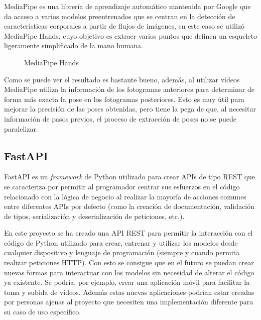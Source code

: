 MediaPipe es una librería de aprendizaje automático mantenida por Google que da
acceso a varios modelos preentrenados que se centran en la detección de
características corporales a partir de flujos de imágenes, en este caso se
utilizó MediaPipe Hands\cite{zhang2020mediapipe}, cuyo objetivo es extraer
varios puntos que definen un esqueleto ligeramente simplificado de la mano
humana.

\begin{figure}[H]
      \centering
      \caption{MediaPipe Hands}
\end{figure}

Como se puede ver el resultado es bastante bueno, además, al utilizar vídeos
MediaPipe utiliza la información de los fotogramas anteriores para determinar de
forma más exacta la pose en los fotogramas posteriores. Esto es muy útil para
mejorar la precisión de las poses obtenidas, pero tiene la pega de que, al
necesitar información de pasos previos, el proceso de extracción de poses no se
puede paralelizar.

\subsection{FastAPI}

FastAPI es un \textit{framework} de Python utilizado para crear APIs de tipo
REST que se caracteriza por permitir al programador centrar sus esfuerzos en el
código relacionado con la lógica de negocio al realizar la mayoría de acciones
comunes entre diferentes APIs por defecto (como la creación de documentación,
validación de tipos, serialización y deserialización de peticiones, etc.).

En este proyecto se ha creado una API REST para permitir la interacción con el
código de Python utilizado para crear, entrenar y utilizar los modelos desde
cualquier dispositivo y lenguaje de programación (siempre y cuando permita
realizar peticiones HTTP). Con esto se consigue que en el futuro se puedan crear
nuevas formas para interactuar con los modelos sin necesidad de alterar el
código ya existente. Se podría, por ejemplo, crear una aplicación móvil para
facilitar la toma y subida de vídeos. Además estas nuevas aplicaciones podrían
estar creadas por personas ajenas al proyecto que necesiten una implementación
diferente para su caso de uso específico.

